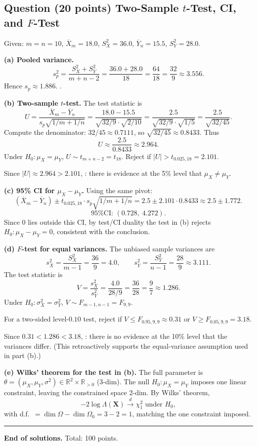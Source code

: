 \documentclass[11pt]{article}
\newcounter{qnum}
\newcommand{\question}[2]{\stepcounter{qnum}\subsection*{Question \theqnum \quad (#1 points) \hfill #2}}
\begin{document}
\question{20}{Two-Sample $t$-Test, CI, and $F$-Test}

Given: $m = n = 10$, $\overline{X}_m = 18.0$, $S_X^2 = 36.0$, $\overline{Y}_n = 15.5$, $S_Y^2 = 28.0$.

\textbf{(a) Pooled variance.}
\[ s_p^2 = \frac{S_X^2 + S_Y^2}{m + n - 2} = \frac{36.0 + 28.0}{18} = \frac{64}{18} = \frac{32}{9} \approx 3.556. \]
Hence $s_p \approx 1.886$. .

\textbf{(b) Two-sample $t$-test.} The test statistic is
\[ U = \frac{\overline{X}_m - \overline{Y}_n}{s_p \sqrt{1/m + 1/n}} = \frac{18.0 - 15.5}{\sqrt{32/9}\cdot \sqrt{2/10}} = \frac{2.5}{\sqrt{32/9} \cdot \sqrt{1/5}} = \frac{2.5}{\sqrt{32/45}}. \]
Compute the denominator: $32/45 \approx 0.7111$, so $\sqrt{32/45} \approx 0.8433$. Thus
\[ U \approx \frac{2.5}{0.8433} \approx 2.964. \]
Under $H_0: \mu_X = \mu_Y$, $U \sim t_{m+n-2} = t_{18}$. Reject if $|U| > t_{0.025,18} = 2.101$.

Since $|U| \approx 2.964 > 2.101$, : there is evidence at the 5\% level that $\mu_X \neq \mu_Y$.

\textbf{(c) 95\% CI for $\mu_X - \mu_Y$.} Using the same pivot:
\[ (\overline{X}_m - \overline{Y}_n) \pm t_{0.025,18} \cdot s_p\sqrt{1/m + 1/n} = 2.5 \pm 2.101 \cdot 0.8433 \approx 2.5 \pm 1.772. \]
\[ \boxed{\text{95\% CI: } (0.728,\; 4.272).} \]
Since $0$ lies outside this CI, by test/CI duality the test in (b) rejects $H_0: \mu_X - \mu_Y = 0$, consistent with the conclusion. \checkmark

\textbf{(d) $F$-test for equal variances.} The unbiased sample variances are
\[ s_X^2 = \frac{S_X^2}{m-1} = \frac{36}{9} = 4.0, \qquad s_Y^2 = \frac{S_Y^2}{n-1} = \frac{28}{9} \approx 3.111. \]
The test statistic is
\[ V = \frac{s_X^2}{s_Y^2} = \frac{4.0}{28/9} = \frac{36}{28} = \frac{9}{7} \approx 1.286. \]
Under $H_0: \sigma_X^2 = \sigma_Y^2$, $V \sim F_{m-1, n-1} = F_{9,9}$.

For a two-sided level-$0.10$ test, reject if $V \le F_{0.95,9,9} \approx 0.31$ or $V \ge F_{0.05,9,9} = 3.18$.

Since $0.31 < 1.286 < 3.18$, : there is no evidence at the 10\% level that the variances differ. (This retroactively supports the equal-variance assumption used in part (b).)

\textbf{(e) Wilks' theorem for the test in (b).} The full parameter is $\theta = (\mu_X, \mu_Y, \sigma^2) \in \mathbb{R}^2 \times \mathbb{R}_{>0}$ (3-dim). The null $H_0: \mu_X = \mu_Y$ imposes one linear constraint, leaving the constrained space 2-dim. By Wilks' theorem,
\[ \boxed{-2 \log \Lambda(\mathbf{X}) \xrightarrow{d} \chi^2_1 \text{ under } H_0,} \]
with d.f.\ $= \dim\Omega - \dim\Omega_0 = 3 - 2 = 1$, matching the one constraint imposed.

\bigskip
\hrule
\bigskip

\begin{center}
\textbf{End of solutions.} \quad Total: 100 points.
\end{center}
\end{document}
